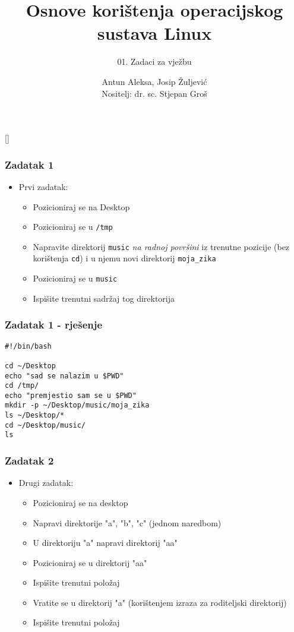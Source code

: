 \documentclass{beamer}
\title{Osnove korištenja operacijskog sustava Linux}
\subtitle{01. Zadaci za vježbu}
\author[Antun Aleksa, Josip Žuljević]{Antun Aleksa, Josip Žuljević\\{\small Nositelj: dr. sc. Stjepan Groš}}
\institute[FER]{Sveučilište u Zagrebu \\
				Fakultet elektrotehnike i računarstva}
\date{\todayiso}
\newcommand{\shell}[1]{\texttt{#1}}
\begin{document}
{
[] %

\begin{frame}
\maketitle
\end{frame}
}

\begin{frame}[t]
\frametitle{Zadatak 1}
\begin{itemize}
  \item Prvi zadatak:
  \begin{itemize}
    \item Pozicioniraj se na Desktop
    \item Pozicioniraj se u \shell{/tmp}
    \item Napravite direktorij \shell{music} \emph{na radnoj površini} iz trenutne pozicije (bez korištenja \shell{cd}) i u njemu novi direktorij \shell{moja\_zika}
	\item Pozicioniraj se u \shell{music}
	\item Ispišite trenutni sadržaj tog direktorija
  \end{itemize}
\end{itemize}
\end{frame}

\begin{frame}[fragile]
\frametitle{Zadatak 1 - rješenje}
    \begin{verbatim}
#!/bin/bash

cd ~/Desktop
echo "sad se nalazim u $PWD"
cd /tmp/
echo "premjestio sam se u $PWD"
mkdir -p ~/Desktop/music/moja_zika
ls ~/Desktop/*
cd ~/Desktop/music/
ls
    \end{verbatim}
\end{frame}

\begin{frame}[t]
\frametitle{Zadatak 2}
\begin{itemize}
  \item Drugi zadatak:
  \begin{itemize}
    \item Pozicioniraj se na desktop
    \item Napravi direktorije "a", "b", "c" (jednom naredbom)
    \item U direktoriju "a" napravi direktorij "aa"
	\item Pozicioniraj se u direktorij "aa"
	\item Ispišite trenutni položaj
	\item Vratite se u direktorij "a" (korištenjem izraza za roditeljski direktorij)
	\item Ispišite trenutni položaj
  \end{itemize}
\end{itemize}
\end{frame}
\end{document}
